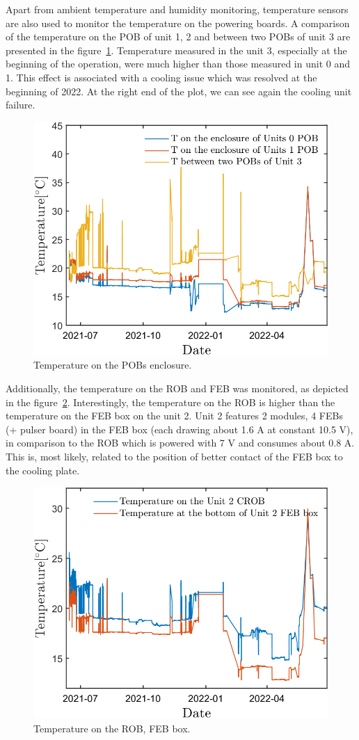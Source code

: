 Apart from ambient temperature and humidity monitoring, temperature sensors are also used to monitor the temperature on the powering boards. A comparison of the temperature on the \gls{POB} of unit 1, 2 and between two POBs of unit 3 are presented in the figure~\ref{fig_POB1}. Temperature measured in the unit 3, especially at the beginning of the operation, were much higher than those measured in unit 0 and 1. This effect is associated with a cooling issue which was resolved at the beginning of 2022. At the right end of the plot, we can see again the cooling unit failure. 
\begin{figure}[!h]
\centering
\includegraphics[width=0.55\columnwidth]{Chapter6/DCS/images/POB1.png}
\caption{Temperature on the POBs enclosure.}
\label{fig_POB1}
\end{figure}
\newpage
Additionally, the temperature on the \gls{ROB} and \gls{FEB} was monitored, as depicted in the figure~\ref{fig_robvsfeb}. Interestingly, the temperature on the \gls{ROB} is higher than the temperature on the \gls{FEB} box on the unit 2. Unit 2 features 2 modules, 4 \gls{FEB}s (+ pulser board) in the \gls{FEB} box (each drawing about 1.6 A at constant 10.5 V), in comparison to the \gls{ROB} which is powered with 7 V and consumes about 0.8 A. This is, most likely, related to the position of better contact of the \gls{FEB} box to the cooling plate.

\begin{figure}[!h]
\centering
\includegraphics[width=0.55\columnwidth]{Chapter6/DCS/images/ROBvsFEB.png}
\caption{Temperature on the \gls{ROB}, \gls{FEB} box.}
\label{fig_robvsfeb}
\end{figure}

